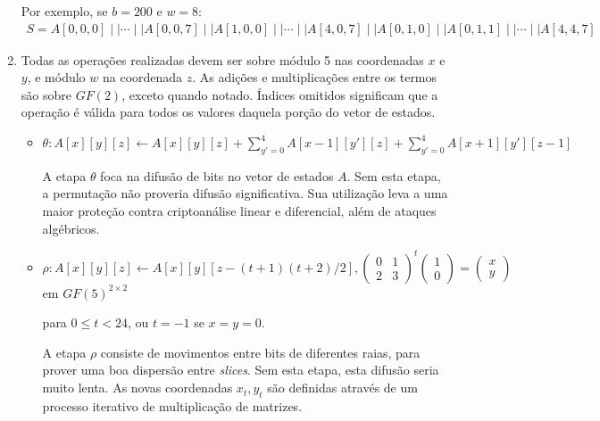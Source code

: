 \documentclass{article}
\begin{document}
\begin{enumerate}[label=(\alph*)]
Por exemplo, se $b = 200$ e $w = 8$:
\begin{align*}
    S = A[0, 0, 0] \mid\mid \cdots \mid\mid A[0, 0, 7] \mid\mid A[1, 0, 0]
    \mid\mid \cdots \mid\mid A[4, 0, 7] \mid\mid A[0, 1, 0] \mid\mid A[0, 1, 1]
    \mid\mid \cdots \mid\mid A[4, 4, 7]
\end{align*}

\item Todas as operações realizadas devem ser sobre módulo 5 nas coordenadas
$x$ e $y$, e módulo $w$ na coordenada $z$. As adições e multiplicações entre
os termos são sobre $GF(2)$, exceto quando notado. Índices omitidos significam
que a operação é válida para todos os valores daquela porção do vetor de
estados.

\begin{itemize}

\item $\theta : A[x][y][z] \longleftarrow A[x][y][z]
    + \displaystyle\sum_{y'=0}^{4} A[x - 1][y'][z]
    + \displaystyle\sum_{y'=0}^{4} A[x + 1][y'][z - 1]$

A etapa $\theta$ foca na difusão de bits no vetor de estados $A$. Sem esta
etapa, a permutação não proveria difusão significativa. Sua utilização leva a
uma maior proteção contra criptoanálise linear e diferencial, além de ataques
algébricos.

\item $\rho : A[x][y][z] \longleftarrow A[x][y][z - (t + 1)(t + 2)/2],
    \begin{pmatrix} 0 & 1 \\ 2 & 3 \end{pmatrix} ^{t}
    \begin{pmatrix} 1 \\ 0 \end{pmatrix}
    = \begin{pmatrix} x \\ y \end{pmatrix} $ em $GF(5)^{2 \times 2}$
    \begin{flushright}
        para $0 \leq t < 24$, ou $t = -1$ se $x = y = 0$.
    \end{flushright}

A etapa $\rho$ consiste de movimentos entre bits de diferentes raias, para
prover uma boa dispersão entre \emph{slices}. Sem esta etapa, esta difusão
seria muito lenta. As novas coordenadas $x_t, y_t$ são definidas através de um
processo iterativo de multiplicação de matrizes.


\end{itemize}
\end{enumerate}
\end{document}
